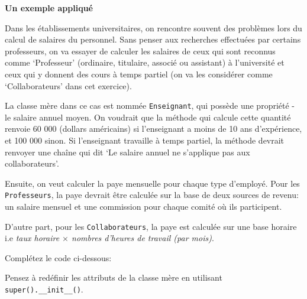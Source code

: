 \begin{Exercice}[30 minutes]\textbf{Un exemple appliqué}
    
    Dans les établissements universitaires, on rencontre souvent des problèmes lors du calcul de salaires du personnel. Sans penser aux recherches effectuées par certains professeurs, on va essayer de calculer les salaires de ceux qui sont reconnus comme `Professeur' (ordinaire, titulaire, associé ou assistant) à l'université et ceux qui y donnent des cours à temps partiel (on va les considérer comme `Collaborateurs' dans cet exercice).
    
    La classe mère dans ce cas est nommée \lstinline{Enseignant}, qui possède une propriété - le salaire annuel moyen. On voudrait que la méthode qui calcule cette quantité renvoie 60 000 (dollars américains) si l'enseignant a moins de 10 ans d'expérience, et 100 000 sinon. Si l'enseignant travaille à temps partiel, la méthode devrait renvoyer une chaîne qui dit `Le salaire annuel ne s'applique pas aux collaborateurs'.
    
    Ensuite, on veut calculer la paye mensuelle pour chaque type d'employé. Pour les \lstinline{Professeurs}, la paye devrait être calculée sur la base de deux sources de revenu: un salaire mensuel et une commission pour chaque comité où ils participent. 
    
    D'autre part, pour les \lstinline{Collaborateurs}, la paye est calculée sur une base horaire i.e \textit{taux horaire $\times$ nombres d'heures de travail (par mois)}.
    
    
    Complétez le code ci-dessous:
    
     
    
    \begin{conseil}
    Pensez à redéfinir les attributs de la classe mère en utilisant \lstinline{super().__init__()}.
    \end{conseil}
    
    \begin{solution}
     
    \end{solution}
    \end{Exercice}

